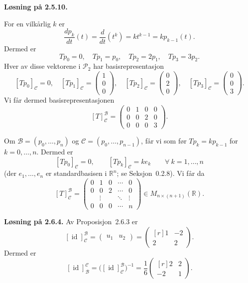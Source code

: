 \documentclass[a4paper,norsk]{article}
\newcommand{\R}{\mathbb{R}}
\newcommand{\Pol}{{\mathcal{P}}}
\DeclareMathOperator{\id}{id}
\newcommand{\basis}{{\mathcal{B}}}
\newcommand{\basiss}{{\mathcal{C}}}
\newenvironment{oppgave}[1]%
	{\trivlist{}\item\relax\textbf{Løsning på #1.}\medspace}%
	{\endtrivlist}
\begin{document}
\begin{oppgave}{2.5.10}
\begin{deloppgave}
\item
For en vilkårlig $k$ er
\[
\frac{dp_k}{dt}(t) = \frac{d}{dt}(t^k) = kt^{k-1} = kp_{k-1}(t).
\]
Dermed er
\[
Tp_0 = 0,\quad Tp_1 = p_0, \quad Tp_2 = 2p_1, \quad Tp_3 = 3p_2.
\]
Hver av disse vektorene i $\Pol_2$ har basisrepresentasjon
\[
[Tp_0]_\basiss = 0, \quad
[Tp_1]_\basiss = \begin{pmatrix}1 \\ 0 \\ 0\end{pmatrix}, \quad
[Tp_2]_\basiss = \begin{pmatrix}0 \\ 2 \\ 0\end{pmatrix}, \quad
[Tp_3]_\basiss = \begin{pmatrix}0 \\ 0 \\ 3\end{pmatrix}.
\]
Vi får dermed basisrepresentasjonen
\[
[T]^\basis_\basiss = \begin{pmatrix}
0 & 1 & 0 & 0 \\
0 & 0 & 2 & 0 \\
0 & 0 & 0 & 3
\end{pmatrix}.
\]
\item
Om $\basis = (p_0,\dots,p_n)$ og $\basiss = (p_0,\dots,p_{n-1})$, får vi som før $Tp_k = kp_{k-1}$ for $k=0,\dots,n$. Dermed er
\[
[Tp_0]_\basiss = 0, \qquad
[Tp_k]_\basiss = ke_{k} \qquad \forall\ k=1,\dots,n
\]
(der $e_1,\dots,e_n$ er standardbasisen i $\R^n$; se Seksjon~0.2.8). Vi får da
\[
[T]^\basis_\basiss = \begin{pmatrix}
0 & 1 & 0 & \cdots & 0 \\
0 & 0 & 2 & \cdots & 0 \\
& \vdots & & \ddots & \vdots \\
0 & 0 & 0 & \cdots & n
\end{pmatrix} \in M_{n\times (n+1)}(\R).
\]
\end{deloppgave}
\end{oppgave}


\begin{oppgave}{2.6.4}
Av Proposisjon~2.6.3 er
\[
[\id]_\basiss^\basis = \begin{pmatrix}u_1 & u_2\end{pmatrix}
= \begin{pmatrix*}[r]
1 & -2 \\ 2 & 2
\end{pmatrix*}.
\]
Dermed er
\[
[\id]_\basis^\basiss = \bigl([\id]_\basiss^\basis\bigr)^{-1}
= \frac16\begin{pmatrix*}[r]
2 & 2 \\ -2 & 1
\end{pmatrix*}.
\]
\end{oppgave}
\end{document}
